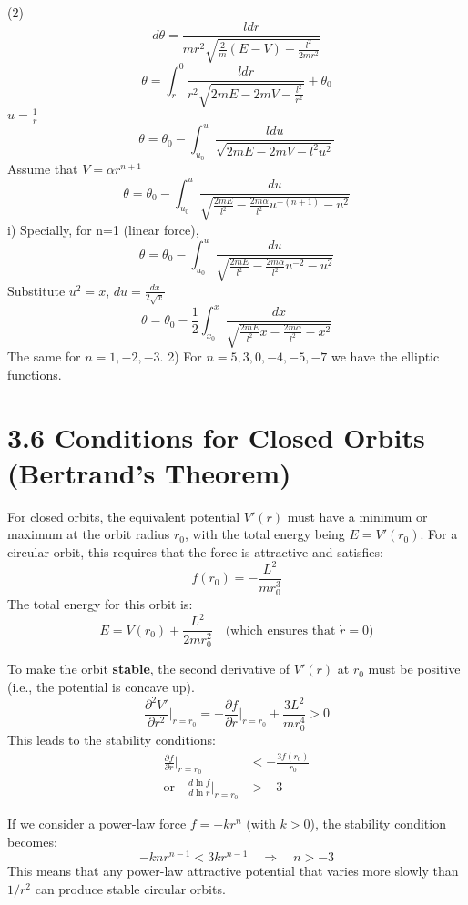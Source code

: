 \documentclass{article}
\begin{document}
    (2)
    \[ d\theta = \frac{ldr}{mr^2\sqrt{\frac{2}{m}(E-V) - \frac{l^2}{2mr^2}}} \]
    \[ \theta = \int_r^0 \frac{ldr}{r^2\sqrt{2mE - 2mV - \frac{l^2}{r^2}}} + \theta_0 \]
    $u = \frac{1}{r}$
    \[ \theta = \theta_0 - \int_{u_0}^u \frac{ldu}{\sqrt{2mE - 2mV - l^2u^2}} \]
    Assume that $V = \alpha r^{n+1}$
    \[ \theta = \theta_0 - \int_{u_0}^u \frac{du}{\sqrt{\frac{2mE}{l^2} - \frac{2m\alpha}{l^2}u^{-(n+1)} - u^2}} \]
    i) Specially, for n=1 (linear force),
    \[ \theta = \theta_0 - \int_{u_0}^u \frac{du}{\sqrt{\frac{2mE}{l^2} - \frac{2m\alpha}{l^2}u^{-2} - u^2}} \]
    Substitute $u^2=x$, $du = \frac{dx}{2\sqrt{x}}$
    \[ \theta = \theta_0 - \frac{1}{2}\int_{x_0}^x \frac{dx}{\sqrt{\frac{2mE}{l^2}x - \frac{2m\alpha}{l^2} - x^2}} \]
    The same for $n=1, -2, -3$.
    2) For $n=5, 3, 0, -4, -5, -7$ we have the elliptic functions.
    
	\section*{3.6 Conditions for Closed Orbits (Bertrand's Theorem)}
	
	For closed orbits, the equivalent potential \(V'(r)\) must have a minimum or maximum at the orbit radius \(r_0\), with the total energy being \(E = V'(r_0)\).
	For a circular orbit, this requires that the force is attractive and satisfies:
	\[
	f(r_0) = -\frac{L^2}{m r_0^3}
	\]
	The total energy for this orbit is:
	\[
	E = V(r_0) + \frac{L^2}{2 m r_0^2} \quad \text{(which ensures that } \dot{r} = 0)
	\]
	
	\bigskip
	
	To make the orbit \textbf{stable}, the second derivative of \(V'(r)\) at \(r_0\) must be positive (i.e., the potential is concave up).
	\[
	\frac{\partial^2 V'}{\partial r^2}\bigg|_{r=r_0} = -\frac{\partial f}{\partial r}\bigg|_{r=r_0} + \frac{3L^2}{m r_0^4} > 0
	\]
	This leads to the stability conditions:
	\begin{align*}
		\frac{\partial f}{\partial r}\bigg|_{r=r_0} &< -\frac{3 f(r_0)}{r_0} \\
		\text{or} \quad \frac{d \ln f}{d \ln r}\bigg|_{r=r_0} &> -3
	\end{align*}
	
	\bigskip
	
	If we consider a power-law force \(f = -k r^n\) (with \(k > 0\)), the stability condition becomes:
	\[
	-k n r^{n-1} < 3k r^{n-1} \quad \Rightarrow \quad n > -3
	\]
	This means that any power-law attractive potential that varies more slowly than \(1/r^2\) can produce stable circular orbits.
	
\end{document}
